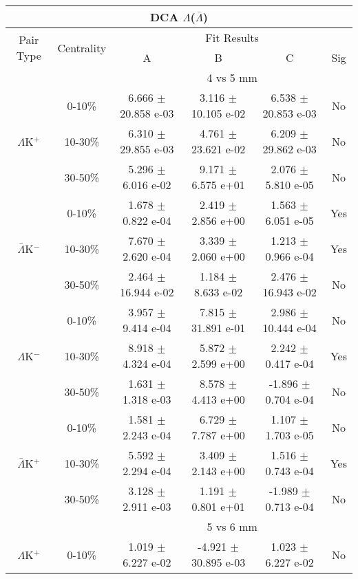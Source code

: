 \documentclass[../AnalysisNoteJBuxton.tex]{subfiles}
\begin{document}
\begin{table}
 \centering
 \begin{tabular}{|c|c|c|c|c|c|}
  \multicolumn{6}{c}{DCA $\Lambda$($\bar{\Lambda}$)} \\
  \hline
  \multirow{2}{*}{Pair Type} & \multirow{2}{*}{Centrality} & \multicolumn{4}{c|}{Fit Results} \\
  \cline{3-6}
   & & A & B & C & Sig \\  
  \hline
  \multicolumn{2}{|c}{} & \multicolumn{4}{c|}{4 vs 5 mm} \\  
  \hline  
  \multirow{3}{*}{$\Lambda$K$^{+}$}
   &  0-10\% & 6.666 $\pm$ 20.858 e-03 & 3.116 $\pm$ 10.105 e-02 & 6.538 $\pm$ 20.853 e-03 & No \\
   & 10-30\% & 6.310 $\pm$ 29.855 e-03 & 4.761 $\pm$ 23.621 e-02 & 6.209 $\pm$ 29.862 e-03 & No \\
   & 30-50\% & 5.296 $\pm$ 6.016 e-02 & 9.171 $\pm$ 6.575 e+01 & 2.076 $\pm$ 5.810 e-05 & No \\
  \hline
  \multirow{3}{*}{$\bar{\Lambda}$K$^{-}$}  
   &  0-10\% & 1.678 $\pm$ 0.822 e-04 & 2.419 $\pm$ 2.856 e+00 & 1.563 $\pm$ 6.051 e-05 & Yes \\
   & 10-30\% & 7.670 $\pm$ 2.620 e-04 & 3.339 $\pm$ 2.060 e+00 & 1.213 $\pm$ 0.966 e-04 & Yes \\
   & 30-50\% & 2.464 $\pm$ 16.944 e-02 & 1.184 $\pm$ 8.633 e-02 & 2.476 $\pm$ 16.943 e-02 & No \\
  \hline \hline
  \multirow{3}{*}{$\Lambda$K$^{-}$}
   &  0-10\% & 3.957 $\pm$ 9.414 e-04 & 7.815 $\pm$ 31.891 e-01 & 2.986 $\pm$ 10.444 e-04 & No \\
   & 10-30\% & 8.918 $\pm$ 4.324 e-04 & 5.872 $\pm$ 2.599 e+00 & 2.242 $\pm$ 0.417 e-04 & Yes \\
   & 30-50\% & 1.631 $\pm$ 1.318 e-03 & 8.578 $\pm$ 4.413 e+00 & -1.896 $\pm$ 0.704 e-04 & No \\
  \hline
  \multirow{3}{*}{$\bar{\Lambda}$K$^{+}$}  
   &  0-10\% & 1.581 $\pm$ 2.243 e-04 & 6.729 $\pm$ 7.787 e+00 & 1.107 $\pm$ 1.703 e-05 & No \\
   & 10-30\% & 5.592 $\pm$ 2.294 e-04 & 3.409 $\pm$ 2.143 e+00 & 1.516 $\pm$ 0.743 e-04 & Yes \\
   & 30-50\% & 3.128 $\pm$ 2.911 e-03 & 1.191 $\pm$ 0.801 e+01 & -1.989 $\pm$ 0.713 e-04 & No \\  
  \hline
  \multicolumn{2}{|c}{} & \multicolumn{4}{c|}{5 vs 6 mm} \\
  \hline  
  \multirow{3}{*}{$\Lambda$K$^{+}$}   
   &  0-10\% & 1.019 $\pm$ 6.227 e-02 & -4.921 $\pm$ 30.895 e-03 & 1.023 $\pm$ 6.227 e-02 & No \\

\end{tabular}
\end{table}
\end{document}
